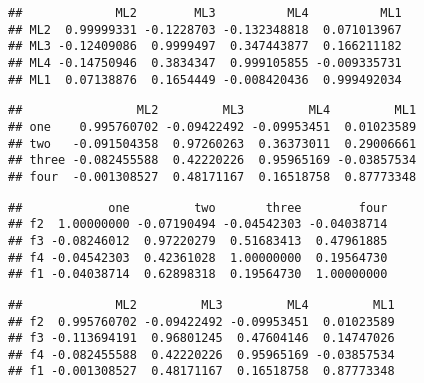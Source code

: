 \documentclass[
]{article}
\newenvironment{Shaded}{\begin{snugshade}}{\end{snugshade}}
\newcommand{\CommentTok}[1]{\textcolor[rgb]{0.56,0.35,0.01}{\textit{#1}}}
\newcommand{\KeywordTok}[1]{\textcolor[rgb]{0.13,0.29,0.53}{\textbf{#1}}}
\newcommand{\NormalTok}[1]{#1}
\newcommand{\OperatorTok}[1]{\textcolor[rgb]{0.81,0.36,0.00}{\textbf{#1}}}
\begin{document}
\begin{verbatim}
##             ML2        ML3          ML4          ML1
## ML2  0.99999331 -0.1228703 -0.132348818  0.071013967
## ML3 -0.12409086  0.9999497  0.347443877  0.166211182
## ML4 -0.14750946  0.3834347  0.999105855 -0.009335731
## ML1  0.07138876  0.1654449 -0.008420436  0.999492034
\end{verbatim}

\begin{Shaded}
\end{Shaded}

\begin{verbatim}
##                ML2         ML3         ML4         ML1
## one    0.995760702 -0.09422492 -0.09953451  0.01023589
## two   -0.091504358  0.97260263  0.36373011  0.29006661
## three -0.082455588  0.42220226  0.95965169 -0.03857534
## four  -0.001308527  0.48171167  0.16518758  0.87773348
\end{verbatim}

\begin{Shaded}
\end{Shaded}

\begin{verbatim}
##            one         two       three        four
## f2  1.00000000 -0.07190494 -0.04542303 -0.04038714
## f3 -0.08246012  0.97220279  0.51683413  0.47961885
## f4 -0.04542303  0.42361028  1.00000000  0.19564730
## f1 -0.04038714  0.62898318  0.19564730  1.00000000
\end{verbatim}

\begin{Shaded}
\end{Shaded}

\begin{verbatim}
##             ML2         ML3         ML4         ML1
## f2  0.995760702 -0.09422492 -0.09953451  0.01023589
## f3 -0.113694191  0.96801245  0.47604146  0.14747026
## f4 -0.082455588  0.42220226  0.95965169 -0.03857534
## f1 -0.001308527  0.48171167  0.16518758  0.87773348
\end{verbatim}
\end{document}
